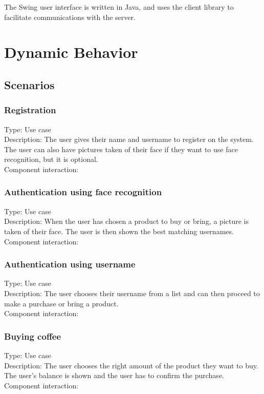 \documentclass[11pt]{article}
\begin{document}
The Swing user interface is written in Java, and uses the client
library to facilitate communications with the server.


\section{Dynamic Behavior}
\subsection{Scenarios}

\subsubsection{Registration}
Type: Use case\\
Description: The user gives their name and username to register on the system. The user can also have pictures taken of their face if they want to use face recognition, but it is optional.\\
Component interaction:\\
   
\subsubsection{Authentication using face recognition}
Type: Use case\\
Description: When the user has chosen a product to buy or bring, a picture is taken of their face. The user is then shown the best matching usernames.\\
Component interaction:\\
   
\subsubsection{Authentication using username}
Type: Use case\\
Description: The user chooses their username from a list and can then proceed to make a purchase or bring a product.\\
Component interaction:\\

\subsubsection{Buying coffee}
Type: Use case\\
Description: The user chooses the right amount of the product they want to buy. The user's balance is shown and the user has to confirm the purchase.\\
Component interaction:\\
\end{document}
